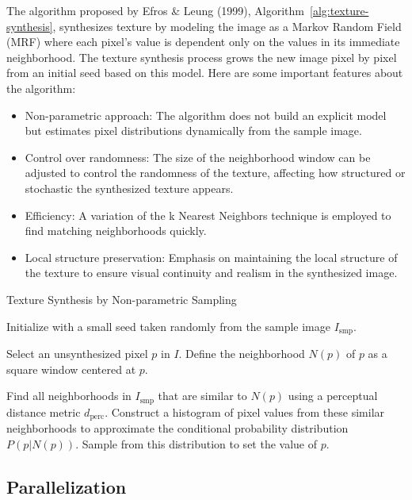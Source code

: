 \documentclass{article}
\begin{document}
The algorithm proposed by Efros \& Leung (1999), Algorithm~\ref{alg:texture-synthesis}, synthesizes texture by modeling the image as a Markov Random Field (MRF) where each pixel's value is dependent only on the values in its immediate neighborhood. 
The texture synthesis process grows the new image pixel by pixel from an initial seed based on this model. Here are some important features about the algorithm:
\begin{itemize}
  \item {Non-parametric approach:} The algorithm does not build an explicit model but estimates pixel distributions dynamically from the sample image.
  \item {Control over randomness:} The size of the neighborhood window can be adjusted to control the randomness of the texture, affecting how structured or stochastic the synthesized texture appears.
  \item {Efficiency:} A variation of the k Nearest Neighbors technique is employed to find matching neighborhoods quickly.
  \item {Local structure preservation:} Emphasis on maintaining the local structure of the texture to ensure visual continuity and realism in the synthesized image.
\end{itemize}

\begin{algorithm}
    \caption{Texture Synthesis by Non-parametric Sampling}\label{alg:texture-synthesis}
    \begin{algorithmic}[1]
    
    \State Initialize with a small seed taken randomly from the sample image $I_{\text{smp}}$.
    
        \State Select an unsynthesized pixel $p$ in $I$.
        \State Define the neighborhood $N(p)$ of $p$ as a square window centered at $p$.
        
        \State Find all neighborhoods in $I_{\text{smp}}$ that are similar to $N(p)$ using a perceptual distance metric $d_{\text{perc}}$.
        \State Construct a histogram of pixel values from these similar neighborhoods to approximate the conditional probability distribution $P(p|N(p))$.
        \State Sample from this distribution to set the value of $p$.
    \EndWhile
    
    \end{algorithmic}
\end{algorithm}

\subsection{Parallelization}
\end{document}
